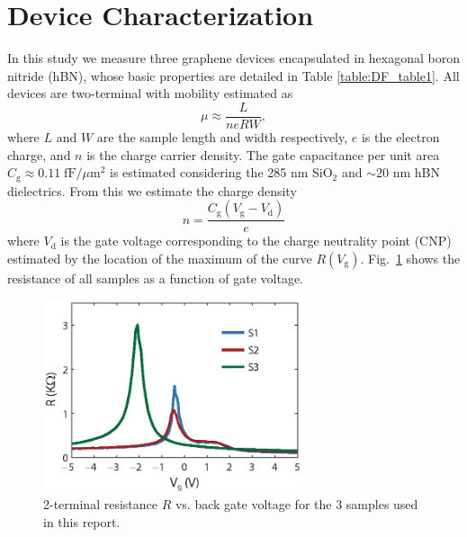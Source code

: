 \section{Device Characterization}
In this study we measure three graphene devices encapsulated in hexagonal boron nitride (hBN), whose basic properties are detailed in Table \ref{table:DF_table1}.    All devices are two-terminal with mobility estimated as \begin{equation}
\mu\approx \frac{L}{neRW},
\end{equation}
where $L$ and $W$ are the sample length and width respectively, $e$ is the electron charge, and $n$ is the charge carrier density.   The gate capacitance per unit area $C_{\mathrm{g}}\approx 0.11\; \mathrm{fF}/\mu \mathrm{m}^2$ is estimated considering the 285 nm SiO$_2$ and $\sim 20$ nm hBN dielectrics.   From this we estimate the charge density \begin{equation}
n=\frac{C_{\mathrm{g}}(V_{\mathrm{g}}-V_{\mathrm{d}})}{e}
\end{equation} where $V_{\mathrm{d}}$ is the gate voltage corresponding to the charge neutrality point (CNP) estimated by the location of the maximum of the curve $R(V_{\mathrm{g}})$.   Fig.~\ref{fig:DF_S1} shows the resistance of all samples as a function of gate voltage.

 \begin{figure}[t]
\includegraphics[width=3in]{figures/Dirac_fluid/S1.eps}
\caption{2-terminal resistance $R$ vs. back gate voltage for the 3 samples used in this report.}
\label{fig:DF_S1}
\end{figure}
